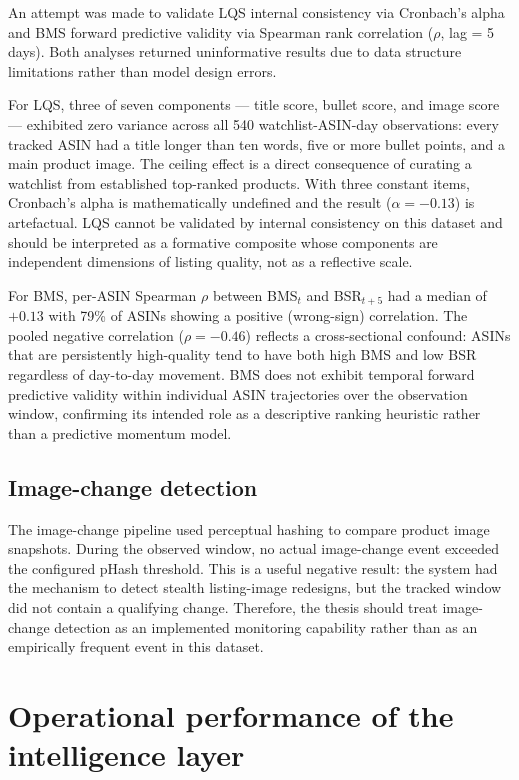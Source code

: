 An attempt was made to validate LQS internal consistency via Cronbach's alpha
and BMS forward predictive validity via Spearman rank correlation
($\rho$, lag = 5 days). Both analyses returned uninformative results due to
data structure limitations rather than model design errors.

For LQS, three of seven components --- title score, bullet score, and image
score --- exhibited zero variance across all 540 watchlist-ASIN-day
observations: every tracked ASIN had a title longer than ten words, five or
more bullet points, and a main product image. The ceiling effect is a direct
consequence of curating a watchlist from established top-ranked products. With
three constant items, Cronbach's alpha is mathematically undefined and the
result ($\alpha = -0.13$) is artefactual. LQS cannot be validated by internal
consistency on this dataset and should be interpreted as a formative composite
whose components are independent dimensions of listing quality, not as a
reflective scale.

For BMS, per-ASIN Spearman $\rho$ between BMS$_t$ and BSR$_{t+5}$ had a
median of $+0.13$ with 79\% of ASINs showing a positive (wrong-sign)
correlation. The pooled negative correlation ($\rho = -0.46$) reflects a
cross-sectional confound: ASINs that are persistently high-quality tend to have
both high BMS and low BSR regardless of day-to-day movement. BMS does not
exhibit temporal forward predictive validity within individual ASIN trajectories
over the observation window, confirming its intended role as a
descriptive ranking heuristic rather than a predictive momentum model.

\subsection{Image-change detection}

The image-change pipeline used perceptual hashing to compare product image snapshots. During the observed window, no actual image-change event exceeded the configured pHash threshold. This is a useful negative result: the system had the mechanism to detect stealth listing-image redesigns, but the tracked window did not contain a qualifying change. Therefore, the thesis should treat image-change detection as an implemented monitoring capability rather than as an empirically frequent event in this dataset.

\section{Operational performance of the intelligence layer}

